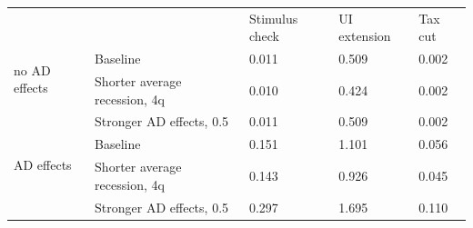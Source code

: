 \documentclass[\latexroot/\projectname]{subfiles}
\begin{document}
\begin{center}
  \begin{tabular}
    {@{}lllll@{}}
    \toprule
                                   &                               & Stimulus check & UI extension & Tax cut \\ \cmidrule(l){1-5}
    \multirow{2}{*}{no AD effects} & Baseline                      & 0.011          & 0.509        & 0.002   \\
                                   & Shorter average recession, 4q & 0.010          & 0.424        & 0.002   \\
                                   & Stronger AD effects, 0.5      & 0.011          & 0.509        & 0.002   \\ \cmidrule(l){1-5}
    \multirow{2}{*}{AD effects}    & Baseline                      & 0.151          & 1.101        & 0.056   \\
                                   & Shorter average recession, 4q & 0.143          & 0.926        & 0.045   \\
                                   & Stronger AD effects, 0.5      & 0.297          & 1.695        & 0.110   \\ \cmidrule(l){1-5}
  \end{tabular}
  \label{tab:robustness_recession_property_results}
\end{center}
\end{document}
